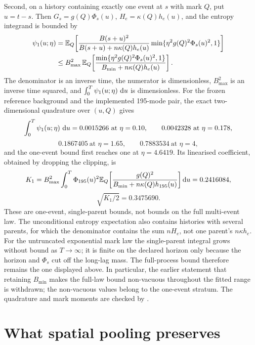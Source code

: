 Second, on a history containing exactly one event at \(s\) with mark \(Q\), put
\(u=t-s\). Then \(G_s=g(Q)\Phi_s(u)\), \(H_e=\kappa(Q)h_e(u)\), and the entropy
integrand is bounded by
\[
\begin{aligned}
\psi_1(u;\eta)
&=\mathbb{E}_Q\!\left[
\frac{B(s+u)^2}{B(s+u)+n\kappa(Q)h_e(u)}
\min\{\eta^2g(Q)^2\Phi_s(u)^2,1\}\right]\\
&\le B_{\max}^2\,\mathbb{E}_Q\!\left[
\frac{\min\{\eta^2g(Q)^2\Phi_s(u)^2,1\}}
{B_{\min}+n\kappa(Q)h_e(u)}\right].
\end{aligned}
\]
The denominator is an inverse time, the numerator is dimensionless,
\(B_{\max}^2\) is an inverse time squared, and
\(\int_0^T\psi_1(u;\eta)\,\mathop{}\!\mathrm{d} u\) is dimensionless. For the frozen reference
background and the implemented 195-mode pair, the exact two-dimensional
quadrature over \((u,Q)\) gives
\[
\int_0^T\psi_1(u;\eta)\,\mathop{}\!\mathrm{d} u
=0.0015266\ \text{at }\eta=0.10,\qquad
0.0042328\ \text{at }\eta=0.178,
\]
\[
0.1867405\ \text{at }\eta=1.65,\qquad
0.7883534\ \text{at }\eta=4,
\]
and the one-event bound first reaches one at \(\eta=4.6419\). Its linearised
coefficient, obtained by dropping the clipping, is
\[
K_1=B_{\max}^2\int_0^T\Phi_{195}(u)^2
\mathbb{E}_Q\!\left[\frac{g(Q)^2}{B_{\min}+n\kappa(Q)h_{195}(u)}\right]\mathop{}\!\mathrm{d} u
=0.2416084,
\]
\[
\sqrt{K_1/2}=0.3475690.
\]
These are one-event, single-parent bounds, not bounds on the full multi-event
law. The unconditional entropy expectation also contains histories with several
parents, for which the denominator contains the sum \(nH_e\), not one parent's
\(n\kappa h_e\). For the untruncated exponential mark law the single-parent
integral grows without bound as \(T\to\infty\); it is finite on the declared
horizon only because the horizon and \(\Phi_s\) cut off the long-lag mass. The
full-process bound therefore remains the one displayed above. In particular,
the earlier statement that retaining \(B_{\min}\) makes the full-law bound
non-vacuous throughout the fitted range is withdrawn; the non-vacuous values
belong to the one-event stratum. The quadrature and mark moments are checked by
.

\section{What spatial pooling preserves}
\label{sec:regional_pooling}

